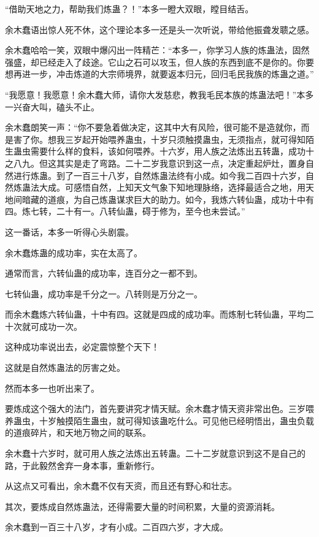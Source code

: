 \begin{this_body}
“借助天地之力，帮助我们炼蛊？！”本多一瞪大双眼，瞠目结舌。

余木蠢语出惊人死不休，这个理论本多一还是头一次听说，带给他振聋发聩之感。

余木蠢哈哈一笑，双眼中爆闪出一阵精芒：“本多一，你学习人族的炼蛊法，固然强盛，却已经走入了歧途。它山之石可以攻玉，但人族的东西到底不是你的。你要想再进一步，冲击炼道的大宗师境界，就要返本归元，回归毛民我族的炼蛊之道。”

“我愿意！我愿意！余木蠢大师，请你大发慈悲，教我毛民本族的炼蛊法吧！”本多一兴奋大叫，磕头不止。

余木蠢朗笑一声：“你不要急着做决定，这其中大有风险，很可能不是造就你，而是害了你。想我三岁起开始喂养蛊虫，十岁只须触摸蛊虫，无须指点，就可得知陌生蛊虫需要什么样的食料，该如何喂养。十六岁，用人族之法炼出五转蛊，成功十之八九。但这其实是走了弯路。二十二岁我意识到这一点，决定重起炉灶，置身自然进行炼蛊。到了一百三十八岁，自然炼蛊法终有小成。如今我二百四十六岁，自然炼蛊法大成。可感悟自然，上知天文气象下知地理脉络，选择最适合之地，用天地间暗藏的道痕，为自己炼蛊谋求巨大的助力。如今，我炼六转仙蛊，成功十中有四。炼七转，二十有一。八转仙蛊，碍于修为，至今也未尝试。”

这一番话，本多一听得心头剧震。

余木蠢炼蛊的成功率，实在太高了。

通常而言，六转仙蛊的成功率，连百分之一都不到。

七转仙蛊，成功率是千分之一。八转则是万分之一。

而余木蠢炼六转仙蛊，十中有四。这就是四成的成功率。而炼制七转仙蛊，平均二十次就可成功一次。

这种成功率说出去，必定震惊整个天下！

这就是自然炼蛊法的厉害之处。

然而本多一也听出来了。

要炼成这个强大的法门，首先要讲究才情天赋。余木蠢才情天资非常出色。三岁喂养蛊虫，十岁触摸陌生蛊虫，就可得知该蛊吃什么。可见他已经明悟出，蛊虫负载的道痕碎片，和天地万物之间的联系。

余木蠢十六岁时，就可用人族之法炼出五转蛊。二十二岁就意识到这不是自己的路，于此毅然舍弃一身本事，重新修行。

从这点又可看出，余木蠢不仅有天资，而且还有野心和壮志。

其次，要炼成自然炼蛊法，还得需要大量的时间积累，大量的资源消耗。

余木蠢到一百三十八岁，才有小成。二百四六岁，才大成。


\end{this_body}
